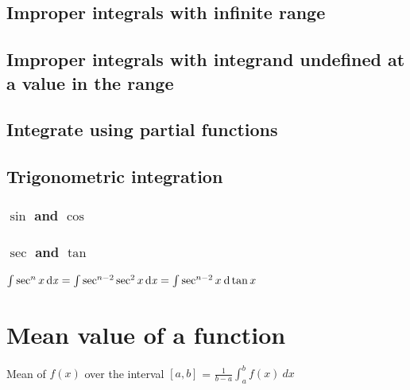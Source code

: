 \subsection{Improper integrals with infinite range}


\subsection{Improper integrals with integrand undefined at a value in the range}


\subsection{Integrate using partial functions}


\subsection{Trigonometric integration}
\subsubsection{$\sin$ and $\cos$}


\subsubsection{$\sec$ and $\tan$}
$\int \sec^n x \operatorname{\mathrm{d}\mathit{x}} = \int \sec^{n-2} \sec^2 x \operatorname{\mathrm{d}\mathit{x}} = \int \sec^{n-2} x \: \mathrm{d} \tan x$

\section{Mean value of a function}
Mean of $f(x)$ over the interval $[a,b]$ = $\frac{1}{b-a}\int_{a}^{b} f(x) \: dx$